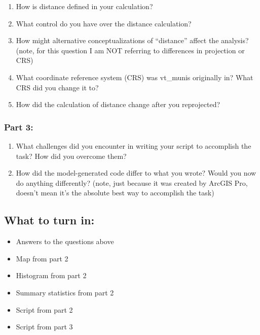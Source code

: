 \documentclass[]{article}
\providecommand{\tightlist}{%
  \setlength{\itemsep}{0pt}\setlength{\parskip}{0pt}}
\begin{document}
\begin{enumerate}
\def\labelenumi{\arabic{enumi}.}
\tightlist
\item
  How is distance defined in your calculation?
\item
  What control do you have over the distance calculation?
\item
  How might alternative conceptualizations of ``distance'' affect the
  analysis? (note, for this question I am NOT referring to differences
  in projection or CRS)
\item
  What coordinate reference system (CRS) was vt\_munis originally in?
  What CRS did you change it to?
\item
  How did the calculation of distance change after you reprojected?
\end{enumerate}

\hypertarget{part-3}{%
\subsubsection{Part 3:}\label{part-3}}

\begin{enumerate}
\def\labelenumi{\arabic{enumi}.}
\setcounter{enumi}{5}
\tightlist
\item
  What challenges did you encounter in writing your script to accomplish
  the task? How did you overcome them?
\item
  How did the model-generated code differ to what you wrote? Would you
  now do anything differently? (note, just because it was created by
  ArcGIS Pro, doesn't mean it's the absolute best way to accomplish the
  task)
\end{enumerate}

\hypertarget{what-to-turn-in}{%
\subsection{What to turn in:}\label{what-to-turn-in}}

\begin{itemize}
\tightlist
\item
  Answers to the questions above
\item
  Map from part 2
\item
  Histogram from part 2
\item
  Summary statistics from part 2
\item
  Script from part 2
\item
  Script from part 3
\end{itemize}
\end{document}
